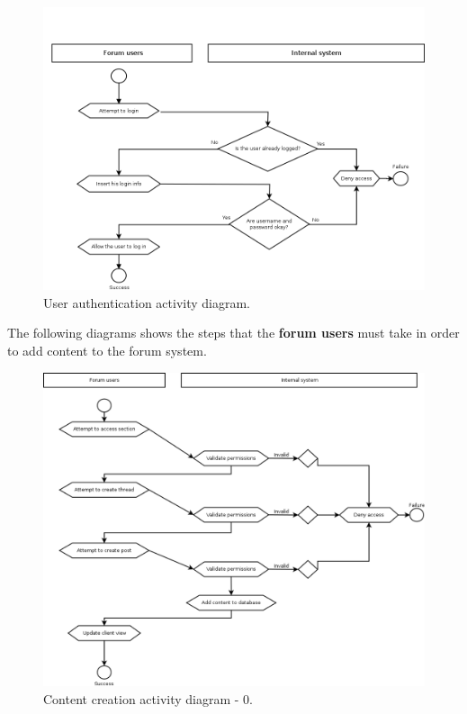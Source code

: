 \documentclass[12pt]{report}
\renewcommand\emph{\textbf}
\begin{document}
                    \begin{figure}[H]
                    \caption{User authentication activity diagram.}
                    \centering
                    \includegraphics[width=1\textwidth]{di/8}
                    \end{figure}

                    \newpage

                    The following diagrams shows the steps that the \emph{forum users} must take in order to add content to the forum system.

                    \begin{figure}[H]
                    \caption{Content creation activity diagram - 0.}
                    \centering
                    \includegraphics[width=1\textwidth]{uc/a2}
                    \end{figure}
\end{document}

